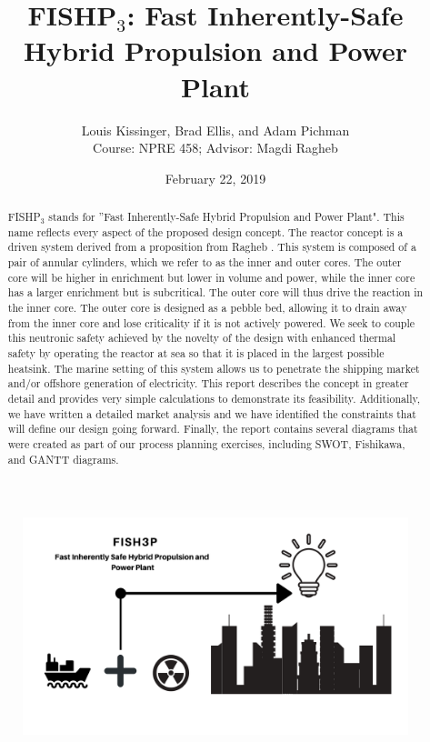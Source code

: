 \documentclass[12pt]{article}
\title{FISHP$_3$: Fast Inherently-Safe Hybrid Propulsion and Power Plant}
\author{Louis Kissinger, Brad Ellis, and Adam Pichman \\Course: NPRE 458; Advisor: Magdi Ragheb}
\date{February 22, 2019}
\begin{document}
\maketitle
\begin{figure}[H]                                  
    \centering                                     
    \includegraphics[width=1\textwidth]{design_logo}   
    \label{fig:mesh1}     
\end{figure}   
%
\pagebreak
\begin{abstract}
FISHP$_3$ stands for ''Fast Inherently-Safe Hybrid Propulsion and Power Plant". This name reflects every aspect of the proposed design concept. The reactor concept is a driven system derived from a proposition from Ragheb \cite{ragheb_pres}. This system is composed of a pair of annular cylinders, which we refer to as the inner and outer cores. The outer core will be higher in enrichment but lower in volume and power, while the inner core has a larger enrichment but is subcritical. The outer core will thus drive the reaction in the inner core. The outer core is designed as a pebble bed, allowing it to drain away from the inner core and lose criticality if it is not actively powered. We seek to couple this neutronic safety achieved by the novelty of the design with enhanced thermal safety by operating the reactor at sea so that it is placed in the largest possible heatsink. The marine setting of this system allows us to penetrate the shipping market and/or offshore generation of electricity. This report describes the concept in greater detail and provides very simple calculations to demonstrate its feasibility. Additionally, we have written a detailed market analysis and we have identified the constraints that will define our design going forward. Finally, the report contains several diagrams that were created as part of our process planning exercises, including SWOT, Fishikawa, and GANTT diagrams.
\end{abstract} 
\end{document}
